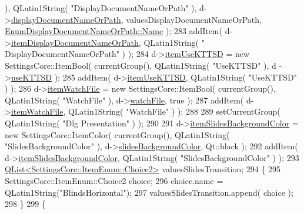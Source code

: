 \begin{DoxyCode}
      ), QLatin1String( \textcolor{stringliteral}{"DisplayDocumentNameOrPath"} ), d->\hyperlink{classOkular_1_1SettingsPrivate_a3f6c60aec6fe2cc4acf6d21382d57abf}{displayDocumentNameOrPath}, 
      valuesDisplayDocumentNameOrPath, \hyperlink{classOkular_1_1Settings_1_1EnumDisplayDocumentNameOrPath_aef0c62073d68d3c208b9a64de8a08fc3a28682097c900a8e648fdc9b4e1fc7d7c}{EnumDisplayDocumentNameOrPath::Name} );
283   addItem( d->\hyperlink{classOkular_1_1SettingsPrivate_a4010969bd67d27abbe14bad23b7ed77f}{itemDisplayDocumentNameOrPath}, QLatin1String( \textcolor{stringliteral}{"
      DisplayDocumentNameOrPath"} ) );
284   d->\hyperlink{classOkular_1_1SettingsPrivate_a7d38a20ebf03326af44123c9fcb72688}{itemUseKTTSD} = \textcolor{keyword}{new} SettingsCore::ItemBool( currentGroup(), QLatin1String( \textcolor{stringliteral}{"UseKTTSD"} ), d
      ->\hyperlink{classOkular_1_1SettingsPrivate_a9142816951c834f3bd7753b6746ef4c2}{useKTTSD} );
285   addItem( d->\hyperlink{classOkular_1_1SettingsPrivate_a7d38a20ebf03326af44123c9fcb72688}{itemUseKTTSD}, QLatin1String( \textcolor{stringliteral}{"UseKTTSD"} ) );
286   d->\hyperlink{classOkular_1_1SettingsPrivate_a3af381a9ba48af46f9038813673f0a12}{itemWatchFile} = \textcolor{keyword}{new} SettingsCore::ItemBool( currentGroup(), QLatin1String( \textcolor{stringliteral}{"WatchFile"} ),
       d->\hyperlink{classOkular_1_1SettingsPrivate_a4a188b886854f837c336215b519b3bcf}{watchFile}, \textcolor{keyword}{true} );
287   addItem( d->\hyperlink{classOkular_1_1SettingsPrivate_a3af381a9ba48af46f9038813673f0a12}{itemWatchFile}, QLatin1String( \textcolor{stringliteral}{"WatchFile"} ) );
288 
289   setCurrentGroup( QLatin1String( \textcolor{stringliteral}{"Dlg Presentation"} ) );
290 
291   d->\hyperlink{classOkular_1_1SettingsPrivate_a2cfd2167d51655fece5c5e64633f82f6}{itemSlidesBackgroundColor} = \textcolor{keyword}{new} SettingsCore::ItemColor( currentGroup(), 
      QLatin1String( \textcolor{stringliteral}{"SlidesBackgroundColor"} ), d->\hyperlink{classOkular_1_1SettingsPrivate_a11f64298e45757b748004b576448cf5b}{slidesBackgroundColor}, Qt::black );
292   addItem( d->\hyperlink{classOkular_1_1SettingsPrivate_a2cfd2167d51655fece5c5e64633f82f6}{itemSlidesBackgroundColor}, QLatin1String( \textcolor{stringliteral}{"SlidesBackgroundColor"} ) 
      );
293   \hyperlink{classQList}{QList<SettingsCore::ItemEnum::Choice2>} valuesSlidesTransition;
294   \{
295     SettingsCore::ItemEnum::Choice2 choice;
296     choice.name = QLatin1String(\textcolor{stringliteral}{"BlindsHorizontal"});
297     valuesSlidesTransition.append( choice );
298   \}
299   \{

\end{DoxyCode}
